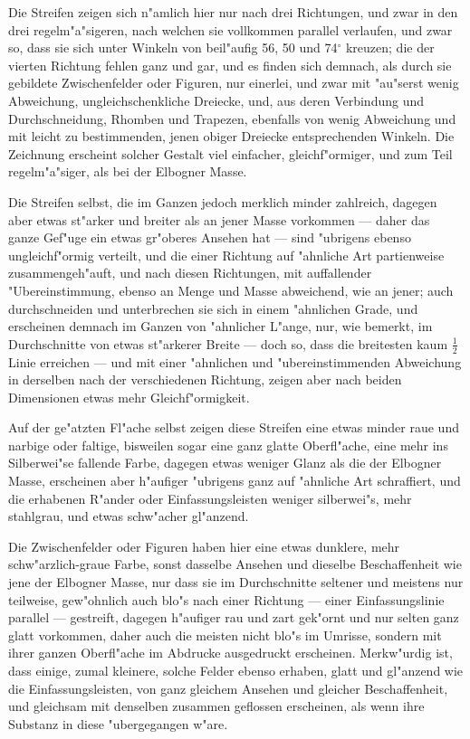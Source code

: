 \documentclass[a4paper, 11pt, oneside, german]{article}
\begin{document}
Die Streifen zeigen sich n"amlich hier nur nach drei Richtungen, und zwar in den drei regelm"a"sigeren, nach welchen sie vollkommen parallel verlaufen, und zwar so, dass sie sich unter Winkeln von beil"aufig 56, 50 und 74$^{\circ}$ kreuzen; die der vierten Richtung fehlen ganz und gar, und es finden sich demnach, als durch sie gebildete Zwischenfelder oder Figuren, nur einerlei, und zwar mit "au"serst wenig Abweichung, ungleichschenkliche Dreiecke, und, aus deren Verbindung und Durchschneidung, Rhomben und Trapezen, ebenfalls von wenig Abweichung und mit leicht zu bestimmenden, jenen obiger Dreiecke entsprechenden Winkeln. Die Zeichnung erscheint solcher Gestalt viel einfacher, gleichf"ormiger, und zum Teil regelm"a"siger, als bei der Elbogner Masse.

Die Streifen selbst, die im Ganzen jedoch merklich minder zahlreich, dagegen aber etwas st"arker und breiter als an jener Masse vorkommen --- daher das ganze Gef"uge ein etwas gr"oberes Ansehen hat --- sind "ubrigens ebenso ungleichf"ormig verteilt, und die einer Richtung auf "ahnliche Art partienweise zusammengeh"auft, und nach diesen Richtungen, mit auffallender "Ubereinstimmung, ebenso an Menge und Masse abweichend, wie an jener; auch durchschneiden und unterbrechen sie sich in einem "ahnlichen Grade, und erscheinen demnach im Ganzen von "ahnlicher L"ange, nur, wie bemerkt, im Durchschnitte von etwas st"arkerer Breite --- doch so, dass die breitesten kaum $\frac{1}{2}$ Linie erreichen --- und mit einer "ahnlichen und "ubereinstimmenden Abweichung in derselben nach der verschiedenen Richtung, zeigen aber nach beiden Dimensionen etwas mehr Gleichf"ormigkeit.

Auf der ge"atzten Fl"ache selbst zeigen diese Streifen eine etwas minder raue und narbige oder faltige, bisweilen sogar eine ganz glatte Oberfl"ache, eine mehr ins Silberwei"se fallende Farbe, dagegen etwas weniger Glanz als die der Elbogner Masse, erscheinen aber h"aufiger "ubrigens ganz auf "ahnliche Art schraffiert, und die erhabenen R"ander oder Einfassungsleisten weniger silberwei"s, mehr stahlgrau, und etwas schw"acher gl"anzend.

Die Zwischenfelder oder Figuren haben hier eine etwas dunklere, mehr schw"arzlich-graue Farbe, sonst dasselbe Ansehen und dieselbe Beschaffenheit wie jene der Elbogner Masse, nur dass sie im Durchschnitte seltener und meistens nur teilweise, gew"ohnlich auch blo"s nach einer Richtung --- einer Einfassungslinie parallel --- gestreift, dagegen h"aufiger rau und zart gek"ornt und nur selten ganz glatt vorkommen, daher auch die meisten nicht blo"s im Umrisse, sondern mit ihrer ganzen Oberfl"ache im Abdrucke ausgedruckt erscheinen. Merkw"urdig ist, dass einige, zumal kleinere, solche Felder ebenso erhaben, glatt und gl"anzend wie die Einfassungsleisten, von ganz gleichem Ansehen und gleicher Beschaffenheit, und gleichsam mit denselben zusammen geflossen erscheinen, als wenn ihre Substanz in diese "ubergegangen w"are.
\end{document}
